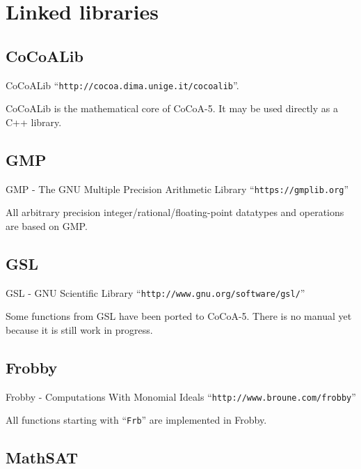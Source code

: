 \documentclass[a4paper]{mybook}
\begin{document}
\chapter{Linked libraries}
\label{Linked libraries}

      

\section{CoCoALib}
\label{CoCoALib}

        
CoCoALib ``\verb&http://cocoa.dima.unige.it/cocoalib&''.
\par 
CoCoALib is the mathematical core of CoCoA-5.
It may be used directly as a C++ library.


\section{GMP}
\label{GMP}

        
GMP - The GNU Multiple Precision Arithmetic Library
``\verb&https://gmplib.org&''
\par 
All arbitrary precision integer/rational/floating-point datatypes and
operations are based on GMP.


\section{GSL}
\label{GSL}

        
GSL - GNU Scientific Library
``\verb&http://www.gnu.org/software/gsl/&''
\par 
Some functions from GSL have been ported to CoCoA-5.
There is no manual yet because it is still work in progress.


\section{Frobby}
\label{Frobby}

        
Frobby - Computations With Monomial Ideals
``\verb&http://www.broune.com/frobby&''
\par 
All functions starting with ``\verb&Frb&'' are implemented in Frobby.


\section{MathSAT}
\label{MathSAT}
\end{document}
